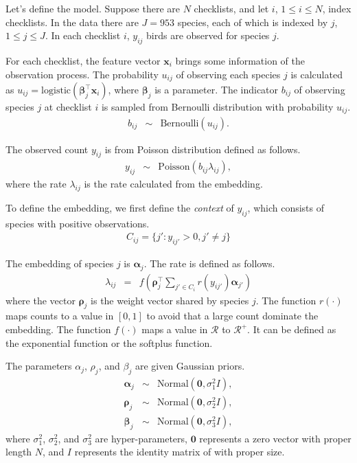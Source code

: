 \documentclass{article}
\newcommand{\wt}{\boldsymbol{\rho}}
\newcommand{\obswt}{\boldsymbol{\beta}}
\newcommand{\emb}{\boldsymbol{\alpha}}
\begin{document}
Let's define the model. Suppose there are $N$ checklists, and let $i$, $1 \le i \le N$, index checklists. In the data there are $J = 953$ species, each of which is indexed by $j$, $1 \le j \le J$.  
In each checklist $i$, $y_{ij}$ birds are observed for species $j$. 

For each checklist, the feature vector $\mathbf{x}_{i}$ brings some information of the observation process. The probability $u_{ij}$ of observing each species $j$ is calculated as $u_{ij} = \mathrm{logistic}(\obswt_j^\top \mathbf{x}_i)$, where $\obswt_j$ is a parameter. The indicator $b_{ij}$ of observing species $j$ at checklist $i$ is sampled from Bernoulli distribution with probability $u_{ij}$. 
\begin{eqnarray}
b_{ij} &\sim& \mathrm{Bernoulli}(u_{ij}).
\end{eqnarray}

The observed count $y_{ij}$ is from Poisson distribution defined as follows. 
\begin{eqnarray}
y_{ij} &\sim& \mathrm{Poisson}(b_{ij} \lambda_{ij}),
\end{eqnarray}
where the rate $\lambda_{ij}$ is the rate calculated from the embedding. 

To define the embedding, we first define the {\it context} of $y_{ij}$, which consists of species with positive observations. 
\begin{eqnarray}
C_{ij} = \{j': y_{ij'} > 0, j' \neq j\}
\end{eqnarray}

The embedding of species $j$ is $\emb_j$. The rate is defined as follows. 
\begin{eqnarray}
\lambda_{ij} &=& f\left(\wt_{j}^\top \sum_{j' \in C_i} r(y_{ij'}) \emb_{j'}\right) \label{lambda_exp} 
\end{eqnarray}
where the vector $\wt_j$ is the weight vector shared by species $j$. The function $r(\cdot)$ maps counts to a value in $[0, 1]$ to avoid that a large count dominate the embedding. The function $f(\cdot)$ maps a value in $\mathcal{R}$ to $\mathcal{R}^{+}$. It can be defined as the exponential function or the softplus function. 

The parameters $\alpha_j$, $\rho_j$, and $\beta_j$ are given Gaussian priors. 
\begin{eqnarray}
\emb_j &\sim& \mathrm{Normal}(\mathbf{0}, \sigma^2_1 I), \\
\wt_j &\sim& \mathrm{Normal}(\mathbf{0}, \sigma^2_2 I), \\
\obswt_j &\sim& \mathrm{Normal}(\mathbf{0}, \sigma^2_3 I),
\end{eqnarray}
where $\sigma_1^2$, $\sigma_2^2$, and $\sigma_3^2$ are hyper-parameters, $\mathbf{0}$ represents a zero vector with proper length $N$, and $I$ represents the identity matrix of with proper size. 
\end{document}

